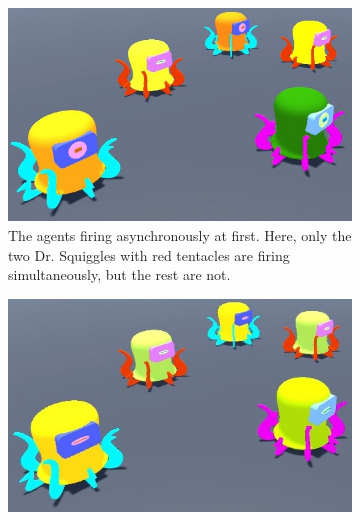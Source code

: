 \begin{figure}[h] %
	\centering
		\begin{subfigure}[t]{.5\textwidth}
			\centering\captionsetup{width=.9\linewidth}%
			\includegraphics[width=0.9\linewidth]{Assets/Figures/IntroUnsynch.jpg}
			\caption{The agents firing asynchronously at first. Here, only the two Dr. Squiggles with red tentacles are firing simultaneously, but the rest are not.}
			\label{initial:unsynch}
		\end{subfigure}%
		\begin{subfigure}[t]{.5\textwidth}
			\centering\captionsetup{width=.9\linewidth}%
			\includegraphics[width=0.9\linewidth]{Assets/Figures/IntroSynch.jpg}

\end{subfigure}
\end{figure}
